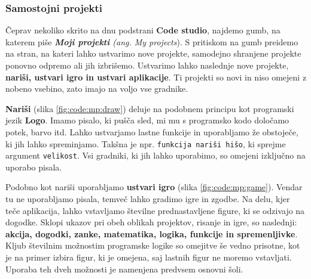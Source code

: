 \subsubsection{Samostojni projekti}
\label{sec:gradnja-projektov}

Čeprav nekoliko skrito na dnu podstrani \textbf{Code studio}, najdemo
gumb, na katerem piše \emph{\textbf{Moji projekti} (ang. My
  projects}). S pritiskom na gumb preidemo na stran, na kateri lahko
ustvarimo nove projekte, samodejno shranjene projekte ponovno odpremo
ali jih izbrišemo. Ustvarimo lahko naslednje nove projekte,
\textbf{nariši, ustvari igro in ustvari aplikacije}. Ti projekti so
novi in niso omejeni z nobeno vsebino, zato imajo na voljo vse
gradnike.

\textbf{Nariši} (slika \ref{fig:code:mp:draw}) deluje na podobnem
principu kot programski jezik \textbf{Logo}. Imamo pisalo, ki pušča
sled, mi mu s programsko kodo določamo potek, barvo itd. Lahko
ustvarjamo lastne funkcije in uporabljamo že obstoječe, ki jih lahko
spreminjamo. Takšna je npr. \texttt{funkcija nariši hišo}, ki
sprejme argument \texttt{velikost}. Vsi gradniki, ki jih lahko
uporabimo, so omejeni izključno na uporabo pisala. 

Podobno kot nariši uporabljamo \textbf{ustvari igro} (slika
\ref{fig:code:mp:game}). Vendar tu ne uporabljamo pisala, temveč lahko
gradimo igre in zgodbe. Na delu, kjer teče aplikacija, lahko vstavljamo
številne prednastavljene figure, ki se odzivajo na dogodke. Sklopi
ukazov pri obeh oblikah projektov, risanje in igre, so naslednji:
\textbf{akcija, dogodki, zanke, matematika, logika, funkcije in
  spremenljivke}. Kljub številnim možnostim programske logike so
omejitve še vedno prisotne, kot je na primer izbira figur, ki je
omejena, saj lastnih figur ne moremo vstavljati. Uporaba teh dveh
možnosti je namenjena predvsem osnovni šoli.

